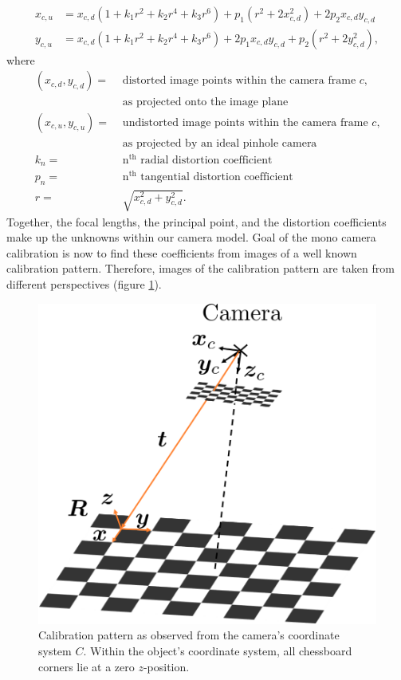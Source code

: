 \begin{align}
	x_{c,u} &= x_{c,d}(1+k_1r^2+k_2r^4+k_3r^6) + p_1(r^2+2x_{c,d}^2) + 2p_2x_{c,d}y_{c,d} 
	\label{eq::324_x_dist}\\
	y_{c,u} &= x_{c,d}(1+k_1r^2+k_2r^4+k_3r^6) + 2p_1x_{c,d}y_{c,d} + p_2(r^2+2y_{c,d}^2),
	\label{eq::324_y_dist}
\end{align}
where
\begin{align}
	(x_{c,d}, y_{c,d}) = &\,\,\text{distorted image points within the camera frame $c$,} 
	\nonumber\\
		                 &\,\,\text{as projected onto the image plane}
	\nonumber\\ 
	(x_{c,u}, y_{c,u}) = &\,\,\text{undistorted image points within the camera frame $c$,}
	\nonumber\\
	                     &\,\,\text{as projected by an ideal pinhole camera}
	\nonumber\\
	k_n = &\,\,\text{n$^\text{th}$ radial distortion coefficient}
	\nonumber\\
	p_n = &\,\,\text{n$^\text{th}$ tangential distortion coefficient}
	\nonumber\\
	r = &\,\,\sqrt{x_{c,d}^2+y_{c,d}^2}.
	\nonumber
\end{align}
Together, the focal lengths, the principal point, and the distortion coefficients make up the unknowns within our camera model. Goal of the mono camera calibration is now to find these coefficients from images of a well known calibration pattern. Therefore, images of the calibration pattern are taken from different perspectives (figure \ref{fig::324_calibration_process}). 
\begin{figure}[h]
	\centering
	\includegraphics[scale=.28]{chapters/03_background/img/calibration_process.png}
	\caption{Calibration pattern as observed from the camera's coordinate system $C$. Within the object's coordinate system, all chessboard corners lie at a zero $z$-position.}
	\label{fig::324_calibration_process}
\end{figure}
